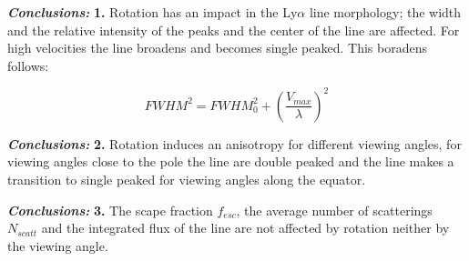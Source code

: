 \documentclass{beamer}
\begin{document}
\begin{frame}{\textit{\textbf{Conclusions:}}}
\textbf{1.} Rotation has an impact in the Ly$\alpha$ line morphology; the width and the relative intensity 
of the peaks and the center of the line are affected.  For high velocities the line broadens and
becomes single peaked. This boradens follows:

\[
FWHM^2 = FWHM_0^2 + \left( \dfrac{V_{max}}{\lambda} \right )^2
\]
\end{frame}

\begin{frame}{\textit{\textbf{Conclusions:}}}
\textbf{2.} Rotation induces an anisotropy for different viewing angles, for viewing angles close to the 
pole the line are double peaked and the line makes a transition to single peaked for viewing 
angles along the equator.
\end{frame}


\begin{frame}{\textit{\textbf{Conclusions:}}}
\textbf{3.} The scape fraction $f_{esc}$, the average number of scatterings $N_{scatt}$ 
and the integrated flux of the line are not affected by rotation neither by the viewing angle.
\end{frame}


\end{document}
